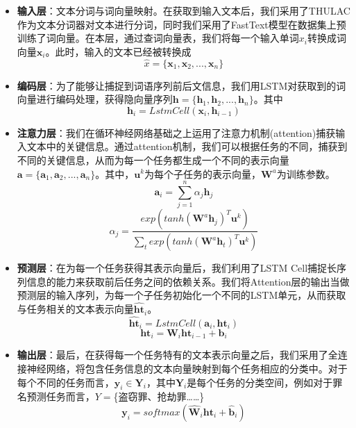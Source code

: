 \begin{itemize}
	\item \textbf{输入层}：文本分词与词向量映射。在获取到输入文本后，我们采用了THULAC作为文本分词器对文本进行分词，同时我们采用了FastText模型在数据集上预训练了词向量。在本层，通过查词向量表，我们将每一个输入单词$x_{i}$转换成词向量$\mathbf{x}_{i}$。此时，输入的文本已经被转换成
	\begin{equation}
		\hat{x} = \{\mathbf{x}_{1}, \mathbf{x}_{2}, ..., \mathbf{x}_{n}\}
	\end{equation}
	\item \textbf{编码层}：为了能够让捕捉到词语序列前后文信息，我们用LSTM对获取到的词向量进行编码处理，获得隐向量序列$\mathbf{h} = \{\mathbf{h}_{1}, \mathbf{h}_{2}, ...,\mathbf{h}_{n}\}$。其中
		\begin{equation}
			\mathbf{h}_{i} = LstmCell(\mathbf{x}_{i}, \mathbf{h}_{i-1})
		\end{equation}
	\item \textbf{注意力层}：我们在循环神经网络基础之上运用了注意力机制(attention)捕获输入文本中的关键信息。通过attention机制，我们可以根据任务的不同，捕获到不同的关键信息，从而为每一个任务都生成一个不同的表示向量$\mathbf{a} = \{\mathbf{a}_{1}, \mathbf{a}_{2}, ..., \mathbf{a}_{n}\}$。其中，$\mathbf{u}^{k}$为每个子任务的表示向量，$\mathbf{W}^{a}$为训练参数。
		\begin{equation}
			\mathbf{a}_{i} = \sum_{j=1}^{n}\alpha_{j}\mathbf{h}_{j}
		\end{equation}
		\begin{equation}
			\alpha_{j} = \frac{exp(tanh(\mathbf{W}^{a}\mathbf{h}_{j})^{T}\mathbf{u}^{k})}{\sum_{t}exp(tanh(\mathbf{W}^{a}\mathbf{h}_{t})^{T}\mathbf{u}^{k})}
		\end{equation}
	\item \textbf{预测层}：在为每一个任务获得其表示向量后，我们利用了LSTM Cell捕捉长序列信息的能力来获取前后任务之间的依赖关系。我们将Attention层的输出当做预测层的输入序列，为每一个子任务初始化一个不同的LSTM单元，从而获取与任务相关的文本表示向量$\hat{\mathbf{ht}}_{i}$。
		\begin{equation}
			\hat{\mathbf{ht}}_{i} = LstmCell(\mathbf{a}_{i}, \mathbf{ht}_{i})
		\end{equation}
		\begin{equation}
			\mathbf{ht}_{i} = \mathbf{W}_{i}\mathbf{ht}_{i-1} + \mathbf{b}_{i}
		\end{equation}
	\item \textbf{输出层}：最后，在获得每一个任务特有的文本表示向量之后，我们采用了全连接神经网络，将包含任务信息的文本向量映射到每个任务相应的分类中。对于每个不同的任务而言，$\mathbf{y}_{i} \in \mathbf{Y}_{i}$，其中$\mathbf{Y}_{i}$是每个任务的分类空间，例如对于罪名预测任务而言，$Y =$\{盗窃罪、抢劫罪……\}
		\begin{equation}
			\mathbf{y}_{i} = softmax(\mathbf{\hat{W}}_{i}\mathbf{ht}_{i} + \mathbf{\hat{b}}_{i})
		\end{equation}
	
\end{itemize}

